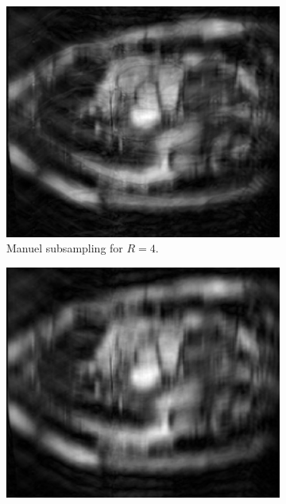 \begin{figure}[h] %
	\centering
	\begin{subfigure}{0.32\textwidth}
    		\includegraphics[width=\textwidth]{./Images/ManualSubsamplingACDC_Mode1.png}
    		\caption{Manuel subsampling for $R=4$.}
    		\label{fig:ManualSubsamplingACDC_Mode1}
	\end{subfigure}
	\hfill 
	\begin{subfigure}{0.32\textwidth}
    		\includegraphics[width=\textwidth]{./Images/ManualSubsamplingACDC_Mode2.png}

\end{subfigure}
\end{figure}
